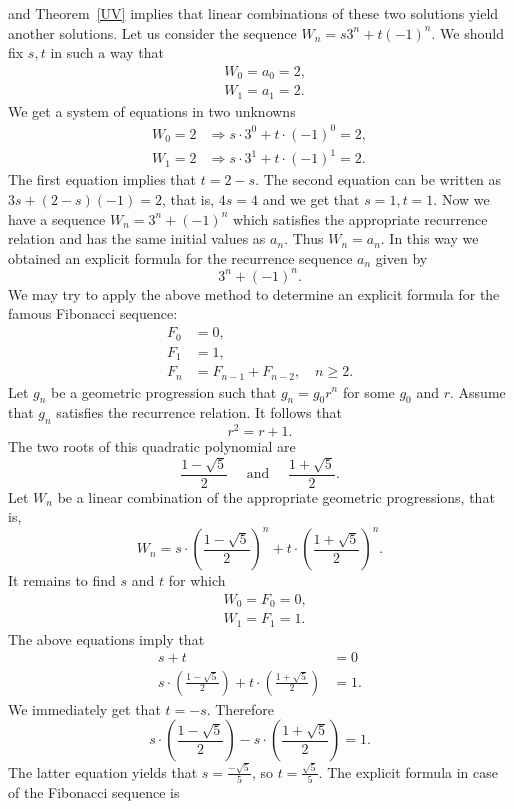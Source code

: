and Theorem~\ref{UV} implies that linear combinations of these two solutions yield another solutions.
Let us consider the sequence $W_n=s3^n+t(-1)^n$. We should fix $s,t$ in such a way that 
\begin{align*}
&W_0=a_0=2,\\
&W_1=a_1=2.
\end{align*}
We get a system of equations in two unknowns
\begin{align*}
W_0=2&\Rightarrow s\cdot 3^0+t\cdot (-1)^0=2,\\
W_1=2&\Rightarrow s\cdot 3^1+t\cdot (-1)^1=2.
\end{align*}
The first equation implies that $t=2-s$. The second equation can be written as $3s+(2-s)(-1)=2$, that is, $4s=4$ and we get that $s=1,t=1$.
Now we have a sequence $W_n=3^n+(-1)^n$ which satisfies the appropriate recurrence relation and has the same initial values as $a_n$.
Thus $W_n=a_n$. In this way we obtained an explicit formula for the recurrence sequence $a_n$ given by
$$
3^n+(-1)^n.
$$
We may try to apply the above method to determine an explicit formula for the famous Fibonacci sequence:
\begin{align*}
F_0&=0,\\
F_1&=1,\\
F_n&=F_{n-1}+F_{n-2},\quad n\geq 2.
\end{align*}
Let $g_n$ be a geometric progression such that $g_n=g_0r^n$ for some $g_0$ and $r$.
Assume that $g_n$ satisfies the recurrence relation. It follows that
$$
r^2=r+1.
$$
The two roots of this quadratic polynomial are
$$
\frac{1-\sqrt{5}}{2}\quad\mbox{ and }\quad\frac{1+\sqrt{5}}{2}.
$$
Let $W_n$ be a linear combination of the appropriate geometric progressions, that is, 
$$
W_n=s\cdot \left(\frac{1-\sqrt{5}}{2}\right)^n+t\cdot \left(\frac{1+\sqrt{5}}{2}\right)^n.
$$
It remains to find $s$ and $t$ for which
\begin{align*}
&W_0=F_0=0,\\
&W_1=F_1=1.
\end{align*}
The above equations imply that
\begin{align*}
s+t&=0\\
s\cdot \left(\frac{1-\sqrt{5}}{2}\right)+t\cdot \left(\frac{1+\sqrt{5}}{2}\right)&=1.
\end{align*}
We immediately get that $t=-s$. Therefore
$$
s\cdot \left(\frac{1-\sqrt{5}}{2}\right)-s\cdot \left(\frac{1+\sqrt{5}}{2}\right)=1.
$$
The latter equation yields that $s=\frac{-\sqrt{5}}{5}$, so  $t=\frac{\sqrt{5}}{5}$.
The explicit formula in case of the Fibonacci sequence is
